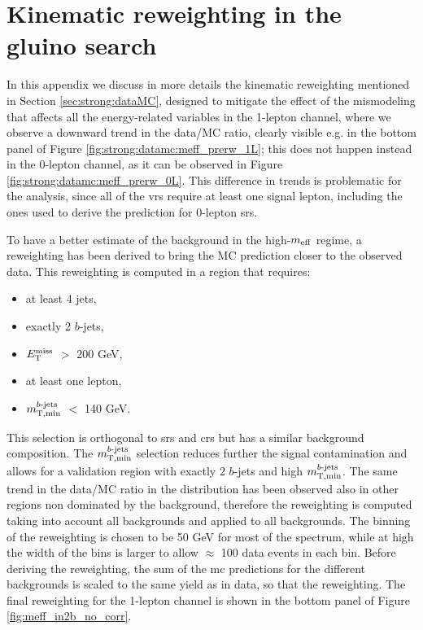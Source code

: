 \chapter{Kinematic reweighting in the gluino search}
\label{app:meffrw}

In this appendix we discuss in more details the kinematic reweighting mentioned in Section \ref{sec:strong:dataMC},
designed to mitigate the effect of the mismodeling that affects all the energy-related variables in the 1-lepton channel,
where we observe a downward trend in the data/MC ratio, clearly visible e.g. in the bottom panel of 
Figure \ref{fig:strong:datamc:meff_prerw_1L}; 
this does not happen instead in the 0-lepton channel, as it can be observed in 
Figure \ref{fig:strong:datamc:meff_prerw_0L}.
This difference in trends is problematic for the analysis, since all of the \glspl{vr} require at least one signal lepton, 
including the ones used to derive the prediction for 0-lepton \glspl{sr}.

To have a better estimate of the background in the high-$m_{\mathrm{eff}}$ regime, a reweighting has been derived to bring the MC prediction closer to the observed data. This reweighting is computed in a region that requires:
\begin{itemize}
\item at least 4 jets,
\item exactly 2 $b$-jets,
\item $E_{\rm T}^{\mathrm{miss}}$ $>$ 200 GeV,
\item at least one lepton,
\item $m_{\mathrm{T, min}}^{b\textrm{-jets}}$ $<$ 140 GeV.
\end{itemize}

This selection is orthogonal to \glspl{sr} and \glspl{cr} but has a similar background composition. 
The $m_{\mathrm{T, min}}^{b\textrm{-jets}}$ selection reduces further the signal contamination and allows for a validation region with exactly 2 $b$-jets and high $m_{\mathrm{T, min}}^{b\textrm{-jets}}$. 
The same trend in the data/MC ratio in the \meff distribution has been observed also in other regions non dominated by the 
\ttbar background,
therefore the reweighting is computed taking into account all backgrounds and applied to all backgrounds. 
The binning of the reweighting is chosen to be 50 GeV for most of the \meff spectrum, 
while at high \meff the width of the bins is larger to allow $\approx$ 100 data events in each bin. 
Before deriving the reweighting, the sum of the \gls{mc} predictions for the different backgrounds is scaled to the same yield as in data,
so that the reweighting.
The final reweighting for the 1-lepton channel is shown in the bottom panel of Figure \ref{fig:meff_in2b_no_corr}.


